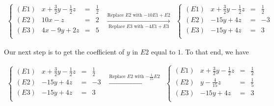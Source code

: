 \begin{ex}
\begin{enumerate}
\[ \begin{array}{ccc}

\left\{ 

\begin{array}{lrcr}

(E1) & x+\frac{3}{2}y-\frac{1}{2}z & = & \frac{1}{2} \\ 
(E2) & 10x-z & = & 2 \\
(E3) &  4x-9y+2z & = & 5 \\

\end{array} 

\right.
&
\xrightarrow[\text{Replace $E3$ with $-4E1 + E3$}]{\text{Replace $E2$ with $-10E1 + E2$}}

&

\left\{ 

\begin{array}{lrcr}

(E1) & x+\frac{3}{2}y-\frac{1}{2}z & = & \frac{1}{2} \\ 
(E2) & -15y+4z & = & -3 \\
(E3) & -15y+4z & = & 3 \\

\end{array} 

\right.
 \end{array} \]

Our next step is to get the coefficient of $y$ in $E2$ equal to $1$.  To that end, we have

\[\begin{array}{ccc}
\left\{ 

\begin{array}{lrcr}

(E1) & x+\frac{3}{2}y-\frac{1}{2}z & = & \frac{1}{2} \\ [3pt]
(E2) & -15y+4z & = & -3 \\ [3pt]
(E3) & -15y+4z & = & 3 \\

\end{array} 

\right.

&
\xrightarrow{\text{Replace $E2$ with $-\frac{1}{15}E2$}}

&

\left\{ 

\begin{array}{lrcr}

(E1) & x+\frac{3}{2}y-\frac{1}{2}z & = & \frac{1}{2} \\ [3pt]
(E2) & y - \frac{4}{15}z & = & \frac{1}{5} \\ [3pt]
(E3) & -15y+4z & = & 3 \\


\end{array}
\end{array}\]
\end{enumerate}
\end{ex}
